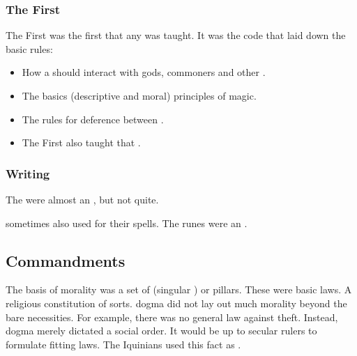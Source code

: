 \subsubsection{The First \Arcanum}
The First \Arcanum was the first \arcanum that any \rethyax was taught. 
It was the \rethyax code that laid down the basic rules:
\begin{itemize}
  \item How a \rethyax should interact with gods, commoners and other \rethyaxes.
  \item The basics (descriptive and moral) principles of magic.
  \item The rules for deference between \rethyaxes. 
  \item 
    The First \Arcanum also taught that . 
\end{itemize}





\subsubsection{Writing}
The  were almost an \arcanum, but not quite. 

\Rethyaxes sometimes also used  for their spells.
The runes were an \arcanum. 









\subsection{Commandments}
The basis of \Ortaican morality was a set of \leges (singular \lex) or pillars. 
These were basic laws. 
A religious constitution of sorts.
\Ortaican dogma did not lay out much morality beyond the bare necessities.
For example, there was no general law against theft.
Instead, \Ortaican dogma merely dictated a social order.
It would be up to secular rulers to formulate fitting laws.
The Iquinians used this fact as .

